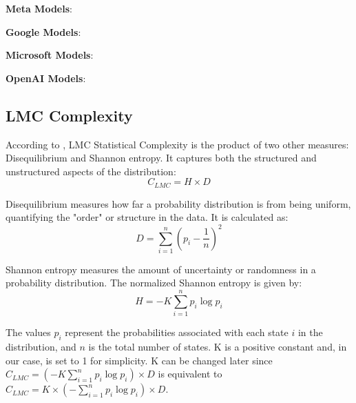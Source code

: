 \begin{tcolorbox}[colback=gray!10, colframe=black, boxrule=1pt, rounded corners]
    \textbf{Meta Models}:
    \cite{MetaLlama4Scout}
    \cite{MetaLlama3.2-3B}
    \cite{MetaLlama3.2-1B}
    \cite{MetaLlama3.1-70B}
    \cite{MetaLlama3.1-8B}
    \cite{MetaLlama3-70B}
    \cite{MetaLlama3-8B}
    \cite{MetaLlama2-70b}
    \cite{MetaLlama2-13b}
    \cite{MetaLlama2-7b}

    \textbf{Google Models}:
    \cite{GoogleGemma3-27b}
    \cite{GoogleGemma3-12b}
    \cite{GoogleGemma3-4b}
    \cite{GoogleGemma3-1b}
    \cite{GoogleGemma2-27b}
    \cite{GoogleGemma2-9b}
    \cite{GoogleGemma2-2b}
    \cite{GoogleGemma-7b}
    \cite{GoogleGemma-2b}
    \cite{GoogleRecurrentGemma-9b}
    \cite{GoogleRecurrentGemma-2b}

    \textbf{Microsoft Models}:
    \cite{MicrosoftPhi4-mini-reasoning}
    \cite{MicrosoftPhi4-reasoning}
    \cite{MicrosoftPhi4-reasoning-plus}
    \cite{MicrosoftPhi4}
    \cite{MicrosoftPhi2}
    \cite{MicrosoftPhi1-5}
    \cite{MicrosoftPhi1}

    \textbf{OpenAI Models}:
    \cite{OpenAIGPT-oss-120b}
    \cite{OpenAIGPT-oss-20b}
    \cite{OpenAIGPT2-xl}
    \cite{OpenAIGPT2-large}
    \cite{OpenAIGPT2-medium}
    \cite{OpenAIGPT2}
\end{tcolorbox}

\subsection{LMC Complexity}

    According to \cite{LopezRuiz1995}, LMC Statistical Complexity is the product of two other measures: Disequilibrium and Shannon entropy. It captures both the structured and unstructured aspects of the distribution:
    \[ C_{LMC} = H \times D \]

    Disequilibrium measures how far a probability distribution is from being uniform, quantifying the "order" or structure in the data. It is calculated as:
    \[ D = \sum_{i=1}^{n} \left(p_i - \frac{1}{n}\right)^2 \]

    Shannon entropy measures the amount of uncertainty or randomness in a probability distribution. The normalized Shannon entropy is given by:
    \[ H = -K \sum_{i=1}^{n} p_i \log p_i \]

    The values \( p_i \) represent the probabilities associated with each state \( i \) in the distribution, and \( n \) is the total number of states. K is a positive constant and, in our case, is set to 1 for simplicity. K can be changed later since \( C_{LMC} = (-K \sum_{i=1}^{n} p_i \log p_i)  \times D \) is equivalent to \( C_{LMC} = K \times (- \sum_{i=1}^{n} p_i \log p_i)  \times D \).

